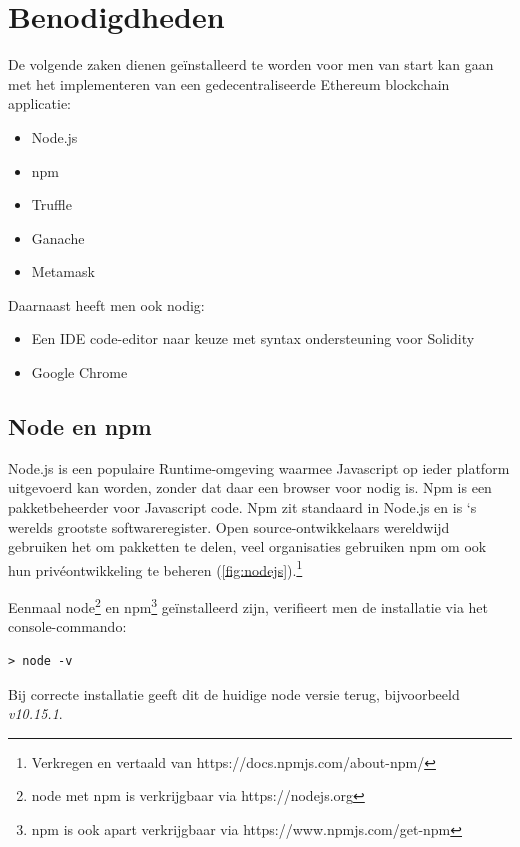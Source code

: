 \section{Benodigdheden}
\label{sec:benodigdheden}
	De volgende zaken dienen geïnstalleerd te worden voor men van start kan gaan met het implementeren van een gedecentraliseerde Ethereum blockchain applicatie:
	\begin{itemize}
		\item{Node.js}
		\item{npm}
		\item{Truffle}
		\item{Ganache}
		\item{Metamask}
	\end{itemize}
	Daarnaast heeft men ook nodig:
	\begin{itemize}
		\item{Een IDE code-editor naar keuze met syntax ondersteuning voor Solidity}
		\item{Google Chrome}
	\end{itemize}
	\subsection{Node en npm}
	Node.js is een populaire Runtime-omgeving waarmee Javascript op ieder platform uitgevoerd kan worden, zonder dat daar een browser voor nodig is. Npm is een pakketbeheerder voor Javascript code. Npm zit standaard in Node.js en is `s werelds grootste softwareregister. Open source-ontwikkelaars wereldwijd gebruiken het om pakketten te delen, veel organisaties gebruiken npm om ook hun privéontwikkeling te beheren (\ref{fig:nodejs}).\footnote{Verkregen en vertaald van https://docs.npmjs.com/about-npm/}
	
	Eenmaal node\footnote{node met npm is verkrijgbaar via https://nodejs.org} en npm\footnote{npm is ook apart verkrijgbaar via https://www.npmjs.com/get-npm} geïnstalleerd zijn, verifieert men de installatie via het console-commando: 
	\lstset{language=bash}
	\begin{lstlisting}[numbers=none]
	> node -v
	\end{lstlisting}Bij correcte installatie geeft dit de huidige node versie terug, bijvoorbeeld \textit{v10.15.1}. 
	
